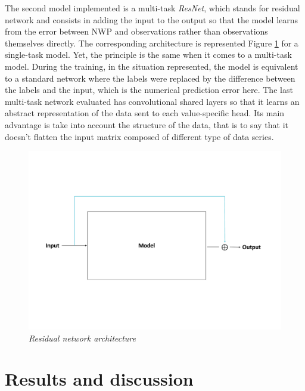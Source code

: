 \documentclass{article}
\newcommand{\saut}{\vspace{10px}}
\begin{document}

\saut

The second model implemented is a multi-task \emph{ResNet}, which stands for residual network and consists in adding
the input to the output so that the model learns from the error between NWP and observations rather than observations
themselves directly. The corresponding architecture is represented Figure \ref{fig:Fig. 3} for a single-task model. Yet,
the principle is the same when it comes to a multi-task model. During the training, in the situation represented,
the model is equivalent to a standard network where the labels were replaced by the difference between the
labels and the input, which is the numerical prediction error here.
The last multi-task network evaluated has convolutional shared layers so that it learns an abstract representation of the
data sent to each value-specific head. Its main advantage is take into account the structure of the data, that is to say
that it doesn't flatten the input matrix composed of different type of data series.

\vspace{-30px}

\begin{figure}[H]
    \centering
    \includegraphics[width=.9\linewidth]{img/residual.pdf}
    \vspace{-30px}
    \caption{\textit{Residual network architecture}}
    \label{fig:Fig. 3}
\end{figure}


\section{Results and discussion}
\end{document}
